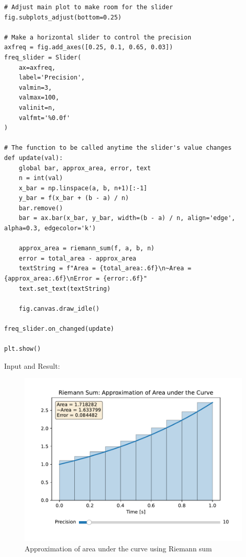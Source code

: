\documentclass[13pt,a4paper]{report}
\begin{document}
\begin{verbatim}
# Adjust main plot to make room for the slider
fig.subplots_adjust(bottom=0.25)

# Make a horizontal slider to control the precision
axfreq = fig.add_axes([0.25, 0.1, 0.65, 0.03])
freq_slider = Slider(
    ax=axfreq,
    label='Precision',
    valmin=3,
    valmax=100,
    valinit=n,
    valfmt='%0.0f'
)

# The function to be called anytime the slider's value changes
def update(val):
    global bar, approx_area, error, text
    n = int(val)
    x_bar = np.linspace(a, b, n+1)[:-1]
    y_bar = f(x_bar + (b - a) / n)
    bar.remove()
    bar = ax.bar(x_bar, y_bar, width=(b - a) / n, align='edge', alpha=0.3, edgecolor='k')

    approx_area = riemann_sum(f, a, b, n)
    error = total_area - approx_area
    textString = f"Area = {total_area:.6f}\n~Area = {approx_area:.6f}\nError = {error:.6f}"
    text.set_text(textString)

    fig.canvas.draw_idle()

freq_slider.on_changed(update)

plt.show()
\end{verbatim}

Input and Result:\\[-0.35cm]
\begin{center}
\begin{figure}[H]
\centering
	\includegraphics[trim={0.5cm 0.75cm 0 0.5cm},clip]{pdfs/riemann_sum.pdf}
	\caption{Approximation of area under the curve using Riemann sum}
\end{figure}
\end{center}
\end{document}
